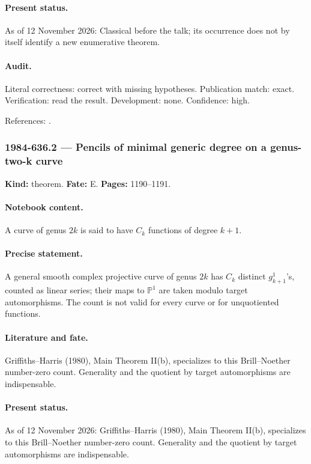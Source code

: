 \paragraph{Present status.} As of 12 November 2026: Classical before the talk; its occurrence does not by itself identify a new enumerative theorem.

\paragraph{Audit.} Literal correctness: correct with missing hypotheses. Publication match: exact. Verification: read the result. Development: none. Confidence: high.

\noindent References: \citep{griffithsharris1980special}.\par

\subsubsection{1984-636.2 --- Pencils of minimal generic degree on a genus-two-k curve}

\label{item:1984-636.2}

\noindent\textbf{Kind:} theorem. \textbf{Fate:} E. \textbf{Pages:} 1190--1191.\par

\paragraph{Notebook content.} A curve of genus \(2k\) is said to have \(C_k\) functions of degree \(k+1\).

\paragraph{Precise statement.} A general smooth complex projective curve of genus \(2k\) has \(C_k\) distinct \(g^1_{k+1}\)'s, counted as linear series; their maps to \(\mathbb P^1\) are taken modulo target automorphisms. The count is not valid for every curve or for unquotiented functions.

\paragraph{Literature and fate.} Griffiths--Harris (1980), Main Theorem II(b), specializes to this Brill--Noether number-zero count. Generality and the quotient by target automorphisms are indispensable.

\paragraph{Present status.} As of 12 November 2026: Griffiths--Harris (1980), Main Theorem II(b), specializes to this Brill--Noether number-zero count. Generality and the quotient by target automorphisms are indispensable.

